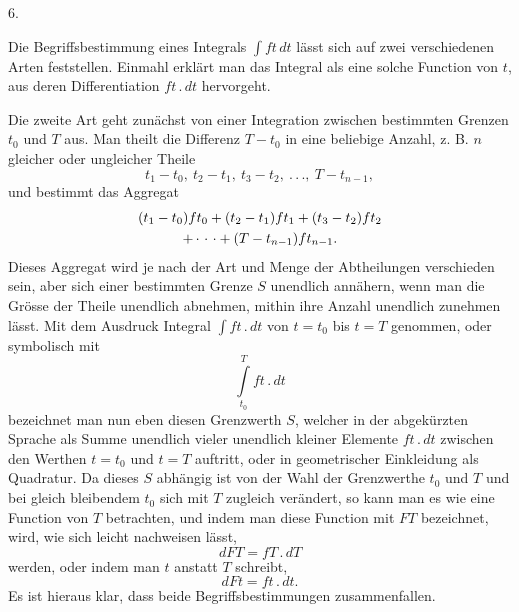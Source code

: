 \begin{center}6.\end{center}
\noindent\hspace*{\parindent}Die Begriffsbestimmung eines Integrals \(\int ft\,dt\) lässt sich auf zwei verschiedenen Arten feststellen.
\clearpage{}
\noindent\hspace*{\parindent}Einmahl erklärt man das Integral als eine solche Function von \(t\), aus deren Differentiation \(ft\,{.}\,dt\) hervorgeht.

Die zweite Art geht zunächst von einer Integration zwischen bestimmten Grenzen \(t_0\) und \(T\) aus. Man theilt die Differenz \(T-t_0\) in eine beliebige Anzahl, z. B. \(n\) gleicher oder ungleicher Theile
\[
t_1-t_0,\ t_2-t_1,\ t_3-t_2,\ { .}\,{.}\,{.},\ T-t_{n-1},
\]
\noindent und bestimmt das Aggregat
\[
\begin{gathered}
(t_1-t_0)ft_0+(t_2-t_1)ft_1+(t_3-t_2)ft_2\\
+\mathinner{\cdotp\,\cdotp\,\cdotp}+(T-t_{n-1})ft_{n-1}.
\end{gathered}
\]
\noindent Dieses Aggregat wird je nach der Art und Menge der Abtheilungen verschieden sein, aber sich einer bestimmten Grenze \(S\) unendlich annähern, wenn man die Grösse der Theile unendlich abnehmen, mithin ihre Anzahl unendlich zunehmen lässt. Mit dem Ausdruck Integral \(\int ft\,{.}\,dt\) von \(t=t_0\) bis \(t=T\) genommen, oder symbolisch mit
\[
\int\limits_{t_0}^{T} ft\,{.}\,dt
\]
\noindent bezeichnet man nun eben diesen Grenzwerth \(S\), welcher in der abgekürzten Sprache als Summe unendlich vieler unendlich kleiner Elemente \(ft\,{.}\,dt\) zwischen den Werthen \(t=t_0\) und \(t=T\) auftritt, oder in geometrischer Einkleidung als Quadratur. Da dieses \(S\) abhängig ist von der Wahl der Grenzwerthe \(t_0\) und \(T\) und bei gleich bleibendem \(t_0\) sich mit \(T\) zugleich verändert, so kann man es wie eine Function von \(T\) betrachten, und indem man diese Function mit \(FT\) bezeichnet, wird, wie sich leicht nachweisen lässt,
\[
dFT=fT\,{.}\,dT
\]
\noindent werden, oder indem man \(t\) anstatt \(T\) schreibt,
\[
dFt=ft\,{.}\,dt.
\]
\noindent Es ist hieraus klar, dass beide Begriffsbestimmungen zusammenfallen.
